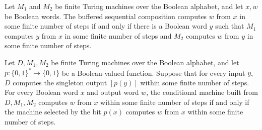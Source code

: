 \begin{theorem}
\label{Turing.FinTM.bufferedCompTM_computes_iff}
\leanok
{}
Let $M_1$ and $M_2$ be finite Turing machines over the Boolean alphabet, and let $x,w$
be Boolean words. The buffered sequential composition computes $w$ from $x$ in some
finite number of steps if and only if there is a Boolean word $y$ such that $M_1$
computes $y$ from $x$ in some finite number of steps and $M_2$ computes $w$ from $y$ in
some finite number of steps.
\end{theorem}

\begin{theorem}
\label{Turing.FinTM.condTM_computes_iff}
\leanok
{}
Let $D,M_1,M_2$ be finite Turing machines over the Boolean alphabet, and let
$p:\{0,1\}^*\to\{0,1\}$ be a Boolean-valued function. Suppose that for every input $y$,
$D$ computes the singleton output $[p(y)]$ within some finite number of steps. For every
Boolean word $x$ and output word $w$, the conditional machine built from $D,M_1,M_2$
computes $w$ from $x$ within some finite number of steps if and only if the machine
selected by the bit $p(x)$ computes $w$ from $x$ within some finite number of steps.
\end{theorem}
